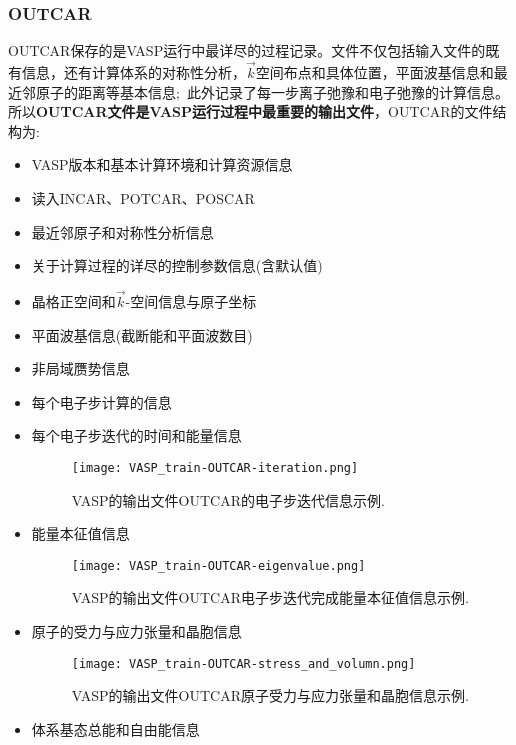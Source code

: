 \subsubsection{\rm{OUTCAR}}
\textrm{OUTCAR}保存的是\textrm{VASP}运行中最详尽的过程记录。文件不仅包括输入文件的既有信息，还有计算体系的对称性分析，$\vec k$空间布点和具体位置，平面波基信息和最近邻原子的距离等基本信息;~此外记录了每一步离子弛豫和电子弛豫的计算信息。所以\textbf{OUTCAR文件是\textrm{VASP}运行过程中最重要的输出文件}，\textrm{OUTCAR}的文件结构为:~
\begin{itemize}
	\item \textrm{VASP}版本和基本计算环境和计算资源信息
	\item 读入\textrm{INCAR}、\textrm{POTCAR}、\textrm{POSCAR}
	\item 最近邻原子和对称性分析信息
	\item 关于计算过程的详尽的控制参数信息(含默认值)
	\item 晶格正空间和$\vec k$-空间信息与原子坐标
	\item 平面波基信息(截断能和平面波数目)
	\item 非局域赝势信息
	\item 每个电子步计算的信息
	\item 每个电子步迭代的时间和能量信息
\begin{figure}[h!]
\centering
\texttt{[image: VASP\_train-OUTCAR-iteration.png]}
\caption{\small \textrm{VASP}的输出文件\textrm{OUTCAR}的电子步迭代信息示例.}%
\label{VASP_train-OUTCAR-iteration}
\end{figure}
	\item 能量本征值信息
\begin{figure}[h!]
\centering
\texttt{[image: VASP\_train-OUTCAR-eigenvalue.png]}
\caption{\small \textrm{VASP}的输出文件\textrm{OUTCAR}电子步迭代完成能量本征值信息示例.}%
\label{VASP_train-OUTCAR-eigenvalue}
\end{figure}
	\item 原子的受力与应力张量和晶胞信息
\begin{figure}[h!]
\centering
\texttt{[image: VASP\_train-OUTCAR-stress\_and\_volumn.png]}
\caption{\small \textrm{VASP}的输出文件\textrm{OUTCAR}原子受力与应力张量和晶胞信息示例.}%
\label{VASP_train-OUTCAR-stress_and_volumn}
\end{figure}
	\item 体系基态总能和自由能信息

\end{itemize}
